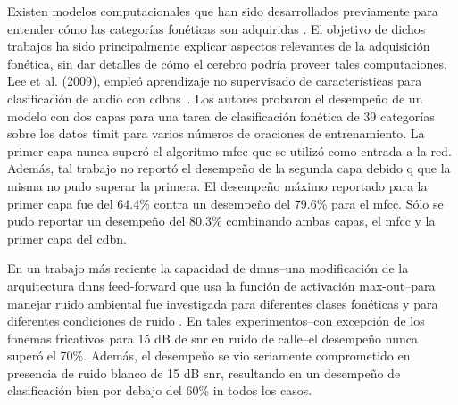 Existen modelos computacionales que han sido desarrollados previamente para entender cómo las categorías fonéticas son adquiridas \cite{rasanen_2012}. El objetivo de dichos trabajos ha sido principalmente explicar aspectos relevantes de la adquisición fonética, sin dar detalles de cómo el cerebro podría proveer tales computaciones. Lee et al. (2009), empleó aprendizaje no supervisado de características para clasificación de audio con \glspl{cdbn}~\cite{Lee:2009:UFL:2984093.2984217}. Los autores probaron el desempeño de un modelo con dos capas para una tarea de clasificación fonética de 39 categorías sobre los datos \gls{timit} para varios números de oraciones de entrenamiento. La primer capa nunca superó el algoritmo \gls{mfcc} que se utilizó como entrada a la red. Además, tal trabajo no reportó el desempeño de la segunda capa debido q que la misma no pudo superar la primera. El desempeño máximo reportado para la primer capa fue del 64.4\% contra un desempeño del 79.6\% para el \gls{mfcc}. Sólo se pudo reportar un desempeño del 80.3\% combinando ambas capas, el \gls{mfcc} y la primer capa del \gls{cdbn}.


En un trabajo más reciente la capacidad de \glspl{dmn}--una modificación de la arquitectura \glspl{dnn} feed-forward que usa la función de activación max-out--para manejar ruido ambiental fue investigada para diferentes clases fonéticas y para diferentes condiciones de ruido \cite{silos_2016}. En tales experimentos--con excepción de los fonemas fricativos para 15 dB de \gls{snr} en ruido de calle--el desempeño nunca superó el 70\%. Además, el desempeño se vio seriamente comprometido en presencia de ruido blanco de 15 dB \gls{snr}, resultando en un desempeño de clasificación bien por debajo del 60\% in todos los casos. 

